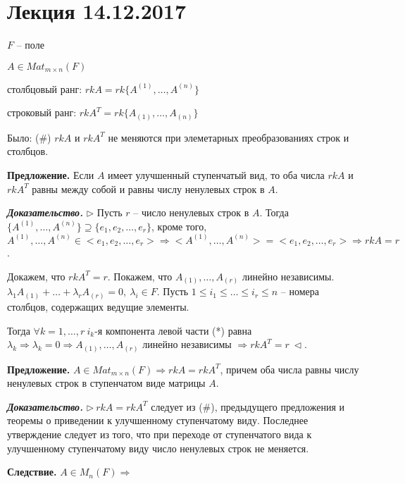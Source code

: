 \section{Лекция 14.12.2017}

$F$ -- поле

$A \in Mat_{m \times n} (F)$

столбцовый ранг: $rkA = rk\{A^{(1)}, \dots, A^{(n)}\}$

строковый ранг: $rkA^T = rk\{A_{(1)}, \dots, A_{(n)}\}$

Было: (\#) $rkA$ и $rkA^T$ не меняются при элеметарных преобразованиях строк и столбцов.

\vspace{\baselineskip}
\textbf{Предложение.} Если $A$ имеет улучшенный ступенчатый вид, то оба числа $rkA$ и $rkA^T$ равны между собой и равны числу ненулевых строк в $A$.

\vspace{\baselineskip}
\textbf{\textit{Доказательство.}} $\rhd$ Пусть $r$ -- число ненулевых строк в $A$. Тогда $\{A^{(1)}, \dots, A^{(n)}\} \supseteq \{e_1, e_2, \dots, e_r\}$, кроме того, $A^{(1)}, \dots, A^{(n)} \in <e_1, e_2, \dots, e_r> \Rightarrow <A^{(1)}, \dots, A^{(n)}> = <e_1, e_2, \dots, e_r> \Rightarrow rkA = r$.

\vspace{\baselineskip}
Докажем, что $rkA^T = r$. Покажем, что $A_{(1)}, \dots, A_{(r)}$ линейно независимы. $\lambda_1 A_{(1)} + \dots + \lambda_r A_{(r)} = 0, \ \lambda_i \in F$. Пусть $1 \leq i_1 \leq \dots \leq i_r \leq n$ -- номера столбцов, содержащих ведущие элементы.

Тогда $\forall k = 1, \dots, r \ i_k$-я компонента левой части (*) равна $\lambda_k \Rightarrow \lambda_k = 0 \Rightarrow A_{(1)}, \dots, A_{(r)}$ линейно независимы $\Rightarrow rkA^T = r \ \lhd$.

\vspace{\baselineskip}
\textbf{Предложение.} $A \in Mat_{m \times n} (F) \Rightarrow rkA = rkA^T$, причем оба числа равны числу ненулевых строк в ступенчатом виде матрицы $A$.

\vspace{\baselineskip}
\textbf{\textit{Доказательство.}} $\rhd \ rkA = rkA^T$ следует из (\#), предыдущего предложения и теоремы о приведении к улучшенному ступенчатому виду. Последнее утверждение следует из того, что при переходе от ступенчатого вида к улучшенному ступенчатому виду число ненулевых строк не меняется.

\vspace{\baselineskip}
\textbf{Следствие.} $A \in M_n (F) \Rightarrow$

